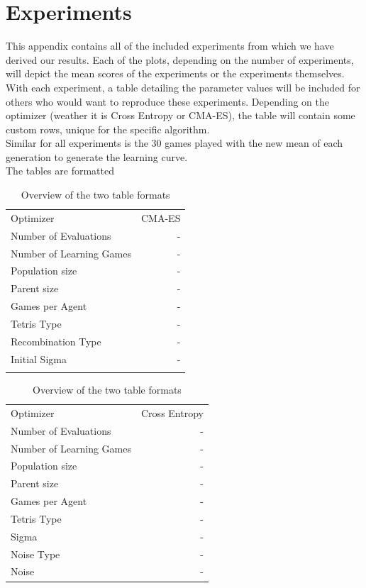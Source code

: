 \section{Experiments}
This appendix contains all of the included experiments from which we have derived our results. Each of the plots, depending on the number of experiments, will depict the mean scores of the experiments or the experiments themselves.\\
With each experiment, a table detailing the parameter values will be included for others who would want to reproduce these experiments. Depending on the optimizer (weather it is Cross Entropy or CMA-ES), the table will contain some custom rows, unique for the specific algorithm.\\
Similar for all experiments is the 30 games played with the new mean of each generation to generate the learning curve.\\
The tables are formatted 
\begin{table}[h]
\centering
\begin{tabular}{l r}
Optimizer & CMA-ES\\
Number of Evaluations & -\\
Number of Learning Games & -\\
Population size& -\\
Parent size & -\\
Games per Agent & -\\
Tetris Type & -\\
\hline
Recombination Type & -\\
Initial Sigma & -\\
 & \\
\end{tabular}
\quad
\begin{tabular}{l r}
Optimizer & Cross Entropy\\
Number of Evaluations & -\\
Number of Learning Games & -\\
Population size & -\\
Parent size & -\\
Games per Agent & -\\
Tetris Type & -\\
\hline
Sigma & -\\
Noise Type & -\\
Noise & -
\end{tabular}
\caption{Overview of the two table formats}
\end{table}

\clearpage

